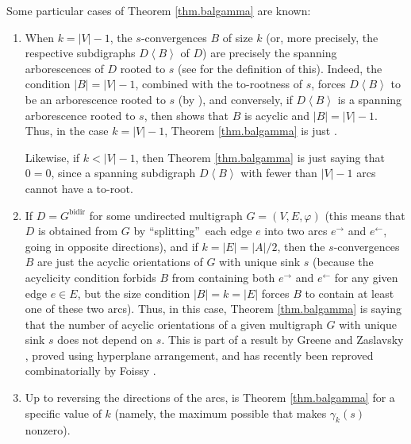 \documentclass[numbers=enddot,12pt,final,onecolumn,notitlepage]{scrartcl}%
\theoremstyle{definition}
\theoremstyle{plainsl}
\begin{document}
Some particular cases of Theorem \ref{thm.balgamma} are known:

\begin{enumerate}
\item When $k=\left\vert V\right\vert -1$, the $s$-convergences $B$ of size
$k$ (or, more precisely, the respective subdigraphs $D\left\langle
B\right\rangle $ of $D$) are precisely the spanning arborescences of $D$
rooted to $s$ (see \cite[Definition 5.10.1 \textbf{(b)}]{22s} for the
definition of this). Indeed, the condition $\left\vert B\right\vert
=\left\vert V\right\vert -1$, combined with the to-rootness of $s$, forces
$D\left\langle B\right\rangle $ to be an arborescence rooted to $s$ (by
\cite[Theorem 5.10.5]{22s}), and conversely, if $D\left\langle B\right\rangle
$ is a spanning arborescence rooted to $s$, then \cite[Theorem 5.10.5]{22s}
shows that $B$ is acyclic and $\left\vert B\right\vert =\left\vert
V\right\vert -1$. Thus, in the case $k=\left\vert V\right\vert -1$, Theorem
\ref{thm.balgamma} is just \cite[Corollary 5.12.1]{22s}.

Likewise, if $k<\left\vert V\right\vert -1$, then Theorem \ref{thm.balgamma}
is just saying that $0=0$, since a spanning subdigraph $D\left\langle
B\right\rangle $ with fewer than $\left\vert V\right\vert -1$ arcs cannot have
a to-root.

\item If $D=G^{\operatorname*{bidir}}$ for some undirected multigraph
$G=\left(  V,E,\varphi\right)  $ (this means that $D$ is obtained from $G$ by
\textquotedblleft splitting\textquotedblright\ each edge $e$ into two arcs
$e^{\rightarrow}$ and $e^{\leftarrow}$, going in opposite directions), and if
$k=\left\vert E\right\vert =\left\vert A\right\vert /2$, then the
$s$-convergences $B$ are just the acyclic orientations of $G$ with unique sink
$s$ (because the acyclicity condition forbids $B$ from containing both
$e^{\rightarrow}$ and $e^{\leftarrow}$ for any given edge $e\in E$, but the
size condition $\left\vert B\right\vert =k=\left\vert E\right\vert $ forces
$B$ to contain at least one of these two arcs). Thus, in this case, Theorem
\ref{thm.balgamma} is saying that the number of acyclic orientations of a
given multigraph $G$ with unique sink $s$ does not depend on $s$. This is part
of a result by Greene and Zaslavsky \cite[Theorem 7.3]{GreZas83}, proved using
hyperplane arrangement, and has recently been reproved combinatorially by
Foissy \cite[Proposition 4.6]{Foissy22}.

\item Up to reversing the directions of the arcs, \cite[Proposition
3.7]{PerPha15} is Theorem \ref{thm.balgamma} for a specific value of $k$
(namely, the maximum possible that makes $\gamma_{k}\left(  s\right)  $ nonzero).
\end{enumerate}
\end{document}
